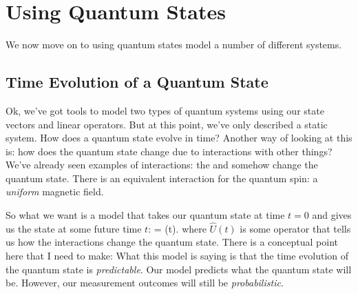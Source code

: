 

\part{Using Quantum States \label{part2}}

We now move on to using quantum states model a number of different systems.

\begin{figure}
\centering
{}
\end{figure}


\chapter{Time Evolution of a Quantum State}
Ok, we've got tools to model two types of quantum systems using our state vectors and linear operators. But at this point, we've only described a static system. How does a quantum state evolve in time? Another way of looking at this is: how does the quantum state change due to interactions with other things? We've already seen examples of interactions: the \hwp and \qwp somehow change the quantum state. There is an equivalent interaction for the quantum spin: a {\em uniform} magnetic field.

So what we want is a model that takes our quantum state at time $t=0$ and gives us the state at some future time $t$:
\beq
{} = (t).
\label{eq:unittime}
\eeq
where $\hat{U}(t)$ is some operator that tells us how the interactions change the quantum state. There is a conceptual point here that I need to make: What this model is saying is that the time evolution of the quantum state is {\em predictable}. Our model predicts what the quantum state will be. However, our measurement outcomes will still be {\em probabilistic}. 

